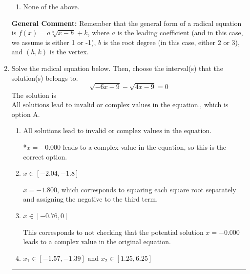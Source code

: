 \documentclass{extbook}[14pt]
\newcommand{\litem}[1]{\item #1

\rule{\textwidth}{0.4pt}}
\begin{document}
\begin{enumerate}
{\begin{enumerate}[label=\Alph*.]
\item None of the above.\end{enumerate}
\textbf{General Comment:} Remember that the general form of a radical equation is $ f(x) = a \sqrt[b]{x - h} + k $, where $a$ is the leading coefficient (and in this case, we assume is either 1 or -1), $b$ is the root degree (in this case, either 2 or 3), and $(h, k)$ is the vertex.
}
\litem{
Solve the radical equation below. Then, choose the interval(s) that the solution(s) belongs to.
\[ \sqrt{-6 x - 9} - \sqrt{4 x - 9} = 0 \]The solution is \( \text{All solutions lead to invalid or complex values in the equation.} \), which is option A.\begin{enumerate}[label=\Alph*.]
\item \( \text{All solutions lead to invalid or complex values in the equation.} \)

*$x = -0.000$ leads to a complex value in the equation, so this is the correct option.
\item \( x \in [-2.04,-1.8] \)

$x = -1.800$, which corresponds to squaring each square root separately and assigning the negative to the third term.
\item \( x \in [-0.76,0] \)

This corresponds to not checking that the potential solution $x = -0.000$ leads to a complex value in the original equation.
\item \( x_1 \in [-1.57, -1.39] \text{ and } x_2 \in [1.25,6.25] \)


\end{enumerate}}
\end{enumerate}
\end{document}
